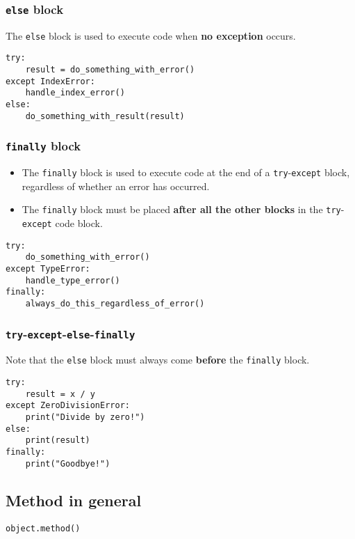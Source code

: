 \documentclass[11pt]{article}
\begin{document}
\subsubsection{\texttt{else} block}
\label{sec:orgafe1686}
The \texttt{else} block is used to execute code when \textbf{no exception} occurs.

\begin{verbatim}
try:
    result = do_something_with_error()
except IndexError:
    handle_index_error()
else:
    do_something_with_result(result)
\end{verbatim}

 \newpage

\subsubsection{\texttt{finally} block}
\label{sec:orgbe15b37}
\begin{itemize}
\item The \texttt{finally} block is used to execute code at the end of a \texttt{try}-\texttt{except} block, regardless of whether an error has occurred.
\item The \texttt{finally} block must be placed \textbf{after all the other blocks} in the \texttt{try}-\texttt{except} code block.
\end{itemize}

\begin{verbatim}
try:
    do_something_with_error()
except TypeError:
    handle_type_error()
finally:
    always_do_this_regardless_of_error()
\end{verbatim}

\subsubsection{\texttt{try}-\texttt{except}-\texttt{else}-\texttt{finally}}
\label{sec:orga1c7bd5}
Note that the \texttt{else} block must always come \textbf{before} the \texttt{finally} block.
\begin{verbatim}
try:
    result = x / y
except ZeroDivisionError:
    print("Divide by zero!")
else:
    print(result)
finally:
    print("Goodbye!")
\end{verbatim}

\subsection{Method in general}
\label{sec:orgca3f910}
\begin{verbatim}
object.method()
\end{verbatim}
\end{document}
